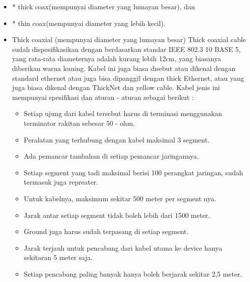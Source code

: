 	\begin{itemize}
		\item * thick coax(mempunyai diameter yang lumayan besar), dan
		\item * thin coax(mempunyai diameter yang lebih kecil).
	
		\item Thick coaxial (mempunyai diameter yang lumayan besar) Thick coaxial cable sudah dispesifikasikan dengan berdasarkan standar IEEE 802.3 10 BASE 5, yang rata-rata diameternya adalah kurang lebih 12cm, yang biasanya diberikan warna kuning. Kabel ini juga biasa disebut atau dikenal dengan standard ethernet atau juga bisa dipanggil dengan thick Ethernet, atau yang juga biasa dikenal dengan ThickNet dan yellow cable. Kabel jenis ini mempunyai spesifikasi dan aturan - aturan sebagai berikut :
			\begin{itemize}
				\item Setiap ujung dari kabel tersebut harus di terminasi menggunakan terminator rakitan sebesar 50 - ohm.
				\item Peralatan yang terhubung dengan kabel maksimal 3 segment.
				\item Ada pemancar tambahan di setiap pemancar jaringannya.
				\item Setiap segment yang tadi maksimal berisi 100 perangkat jaringan, sudah termasuk juga repreater.
				\item Untuk kabelnya, maksimum sekitar 500 meter per segment nya.
				\item Jarak antar setiap segment tidak boleh lebih dari 1500 meter.
				\item Ground juga harus sudah terpasang di setiap segment.
				\item Jarak terjauh untuk pencabang dari kabel utama ke device hanya sekitaran 5 meter saja.
				\item Setiap pencabang paling banyak hanya boleh berjarak sekitar 2,5 meter.
			\end{itemize}
			

\end{itemize}
